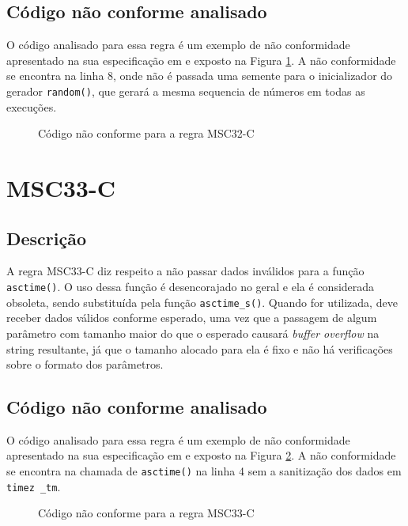\subsection{Código não conforme analisado}

O código analisado para essa regra é um exemplo de não conformidade apresentado na sua especificação em \cite{ccert} e exposto na Figura \ref{fig:MSC32-C}. A não conformidade se encontra na linha 8, onde não é passada uma semente para o inicializador do gerador \texttt{random()}, que gerará a mesma sequencia de números em todas as execuções.

\begin{figure}[h!]
  \centering
  
  \caption{Código não conforme para a regra MSC32-C}
\label{fig:MSC32-C}
\end{figure}

\section{MSC33-C}
\subsection{Descrição}

A regra MSC33-C diz respeito a não passar dados inválidos para a função \texttt{asctime()}. O uso dessa função é desencorajado no geral e ela é considerada obsoleta, sendo substituída pela função \texttt{asctime\_s()}. Quando for utilizada, deve receber dados válidos conforme esperado, uma vez que a passagem de algum parâmetro com tamanho maior do que o esperado causará \textit{buffer overflow} na string resultante, já que o tamanho alocado para ela é fixo e não há verificações sobre o formato dos parâmetros.

\subsection{Código não conforme analisado}

O código analisado para essa regra é um exemplo de não conformidade apresentado na sua especificação em \cite{ccert} e exposto na Figura \ref{fig:MSC33-C}. A não conformidade se encontra na chamada de \texttt{asctime()} na linha 4 sem a sanitização dos dados em \texttt{timez
\_tm}.

\begin{figure}[h!]
  \centering
  
  \caption{Código não conforme para a regra MSC33-C}
\label{fig:MSC33-C}
\end{figure}
